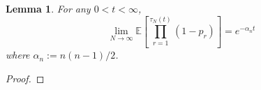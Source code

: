 \documentclass{article}
\newtheorem{lemma}{Lemma}
\newcommand{\E}{\mathbb{E}}
\newcommand{\1}[1]{\mathbbm{1}_{#1}}
\begin{document}
\begin{lemma}\label{thm:basis}
For any $0 < t < \infty$,
\begin{equation}
\lim_{N\to\infty} \E\left[ \prod_{r=1}^{\tau_N(t)} (1-p_r) \right] = e^{-\alpha_n t}
\end{equation}
where $\alpha_n := n(n-1)/2$.
\end{lemma}
\begin{proof}

\end{proof}
\end{document}
